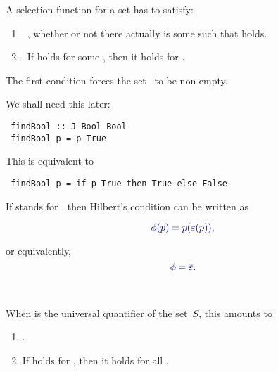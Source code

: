 \documentclass%
[%
Screen4to3,
]{foils}
\begin{document}

A selection function \darkblue{$\varepsilon$} for a set 
has to satisfy:

\vfill

\begin{enumerate}
\item[\grey{1.}]~, whether or not there actually is some  such that  holds. 
\item[\grey{2.}]~If  holds for some , then it holds for . 
\end{enumerate}

\vfill

The first condition forces the set~ to be non-empty.

We shall need this later:
\begin{verbatim}
 findBool :: J Bool Bool
 findBool p = p True
\end{verbatim}

\vfill

This is equivalent to
\begin{verbatim}
 findBool p = if p True then True else False
\end{verbatim}


If  stands for , then Hilbert's
condition can be written as %

\[
\darkblue{\phi(p) = p(\varepsilon(p))},
\]

or equivalently, %
\[
\darkblue{\phi = \overline{\varepsilon}}.
\]


~



When  is the universal quantifier
 of the set~$S$, this amounts to
\begin{enumerate}
\item {}.
\item If  holds for ,
  then it holds for all .
\end{enumerate}
\end{document}
